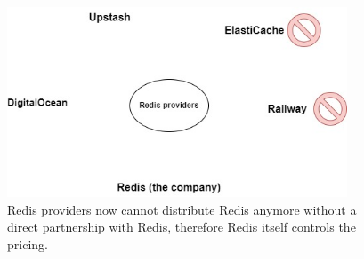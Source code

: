 \begin{figure}[H]
      \centering
      \includegraphics[width=0.9\textwidth]{Figures/Redis Providers.jpg}
      \caption{Redis providers now cannot distribute Redis anymore without a direct partnership with Redis, therefore Redis itself controls
            the pricing.}
\end{figure}



